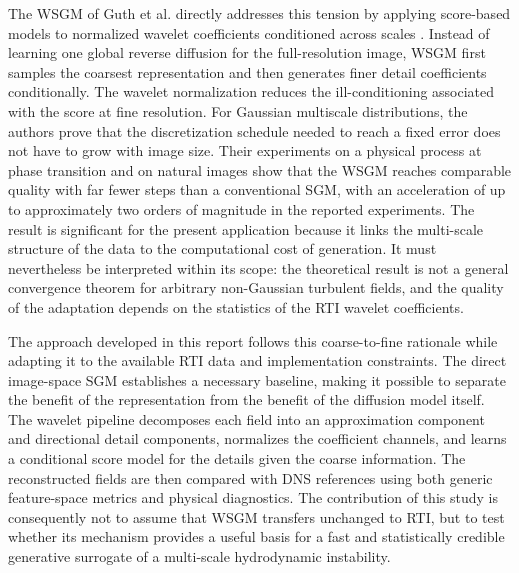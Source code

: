 The WSGM of Guth et al. directly addresses this tension by applying score-based models to normalized wavelet coefficients conditioned across scales \citep{Guth2022WSGM}. Instead of learning one global reverse diffusion for the full-resolution image, WSGM first samples the coarsest representation and then generates finer detail coefficients conditionally. The wavelet normalization reduces the ill-conditioning associated with the score at fine resolution. For Gaussian multiscale distributions, the authors prove that the discretization schedule needed to reach a fixed error does not have to grow with image size. Their experiments on a physical process at phase transition and on natural images show that the WSGM reaches comparable quality with far fewer steps than a conventional SGM, with an acceleration of up to approximately two orders of magnitude in the reported experiments. The result is significant for the present application because it links the multi-scale structure of the data to the computational cost of generation. It must nevertheless be interpreted within its scope: the theoretical result is not a general convergence theorem for arbitrary non-Gaussian turbulent fields, and the quality of the adaptation depends on the statistics of the RTI wavelet coefficients.

The approach developed in this report follows this coarse-to-fine rationale while adapting it to the available RTI data and implementation constraints. The direct image-space SGM establishes a necessary baseline, making it possible to separate the benefit of the representation from the benefit of the diffusion model itself. The wavelet pipeline decomposes each field into an approximation component and directional detail components, normalizes the coefficient channels, and learns a conditional score model for the details given the coarse information. The reconstructed fields are then compared with DNS references using both generic feature-space metrics and physical diagnostics. The contribution of this study is consequently not to assume that WSGM transfers unchanged to RTI, but to test whether its mechanism provides a useful basis for a fast and statistically credible generative surrogate of a multi-scale hydrodynamic instability.
